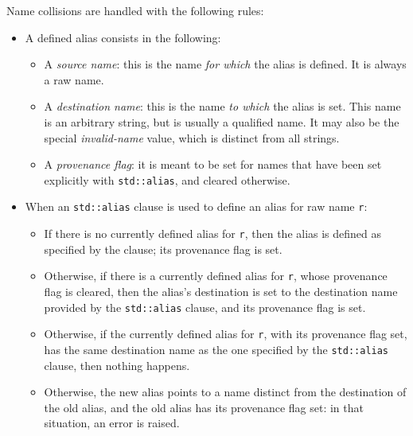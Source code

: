 Name collisions are handled with the following rules:
\begin{itemize}

    \item A defined alias consists in the following:
    \begin{itemize}

        \item A \emph{source name}: this is the name \emph{for which}
        the alias is defined. It is always a raw name.

        \item A \emph{destination name}: this is the name \emph{to
        which} the alias is set. This name is an arbitrary string, but
        is usually a qualified name. It may also be the special
        \emph{invalid-name} value, which is distinct from all strings.

        \item A \emph{provenance flag}: it is meant to be set for names
        that have been set explicitly with \verb|std::alias|, and cleared
        otherwise.

    \end{itemize}

    \item When an \verb|std::alias| clause is used to define an alias
    for raw name \verb|r|:
    \begin{itemize}

        \item If there is no currently defined alias for \verb|r|, then
        the alias is defined as specified by the clause; its provenance
        flag is set.

        \item Otherwise, if there is a currently defined alias for
        \verb|r|, whose provenance flag is cleared, then the alias's
        destination is set to the destination name provided by the
        \verb|std::alias| clause, and its provenance flag is set.

        \item Otherwise, if the currently defined alias for \verb|r|,
        with its provenance flag set, has the same destination name as
        the one specified by the \verb|std::alias| clause, then nothing
        happens.

        \item Otherwise, the new alias points to a name distinct from
        the destination of the old alias, and the old alias has its
        provenance flag set: in that situation, an error is raised.


\end{itemize}
\end{itemize}
